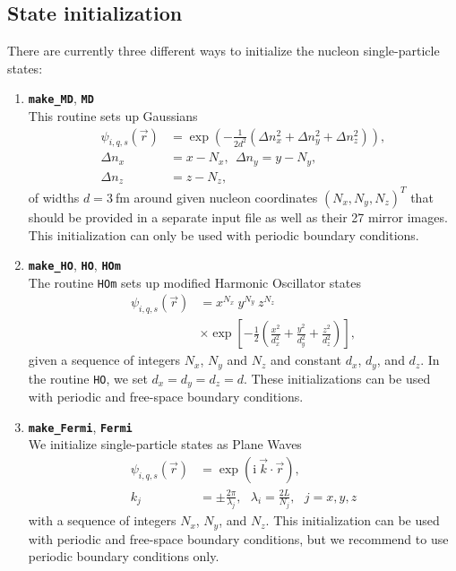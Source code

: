 \documentclass[3p]{elsarticle}
\begin{document}
\subsection{State initialization}
There are currently three different ways to initialize the nucleon single-particle states: 
\begin{enumerate}
	\item \textbf{\texttt{make\_MD}}, \textbf{\texttt{MD}}\\
	This routine sets up Gaussians  
	\begin{align}
	\psi_{i,q,s} (\vec{r}) &= \exp{\left(- \frac{1}{2 d^2} \left( \Delta n_x^2 + \Delta n_y^2 + \Delta n_z^2\right) \right)}, \\
	\Delta n_x &= x - N_x, \:\: \Delta n_y = y - N_y, \nonumber\\ 
	\Delta n_z &= z - N_z,  
	\end{align}
	of widths $d = 3\:$fm around given nucleon coordinates $(N_x, N_y, N_z)^T$ that should be provided in a separate input file as well as their 27 mirror images. This initialization can only be used with periodic boundary conditions. 
	\item  \textbf{\texttt{make\_HO}}, \textbf{\texttt{HO}}, \textbf{\texttt{HOm}}\\
	The routine \texttt{HOm} sets up modified Harmonic Oscillator states
	\begin{align}
	\psi_{i,q,s} (\vec{r}) &= x^{N_x} \: y^{N_y} \: z^{N_z} \nonumber\\
	 & \times \exp{\left[- \frac{1}{2} \left( \frac{x^2}{d_x^2} + \frac{y^2}{d_y^2} + \frac{z^2}{d_z^2} \right) \right]}, 
	\end{align}
	given a sequence of integers $N_x$, $N_y$ and $N_z$ and constant $d_x$, $d_y$, and $d_z$. In the routine \texttt{HO}, we set $d_x = d_y = d_z = d$. These initializations can be used with periodic and free-space boundary conditions.
	\item \textbf{\texttt{make\_Fermi}}, \textbf{\texttt{Fermi}}\\
	We initialize single-particle states as Plane Waves
	\begin{align}
	\psi_{i,q,s} (\vec{r}) &= \exp \left( \mathrm{i}  \: \vec{k} \cdot \vec{r} \right), \\ 
	k_j &= \pm \frac{2 \pi}{\lambda_j}, \:\:\: \lambda_i = \frac{2 L}{N_j}, \:\:\: j = x, y, z
	\end{align}
	with a sequence of integers $N_x$, $N_y$, and $N_z$. This initialization can be used with periodic and free-space boundary conditions, but we recommend to use periodic boundary conditions only.
\end{enumerate}
\end{document}
